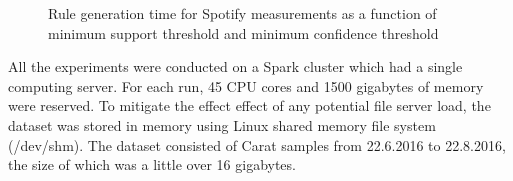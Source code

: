 \begin{figure}[htp]



\caption{Rule generation time for Spotify measurements as a function of minimum support threshold and minimum confidence threshold}
\label{figure:runtimes-spotify}
\end{figure}

All the experiments were conducted on a Spark cluster which had a single computing server. For each run, 45 CPU cores and 1500 gigabytes of memory were reserved. To mitigate the effect effect of any potential file server load, the dataset was stored in memory using Linux shared memory file system (/dev/shm). The dataset consisted of Carat samples from 22.6.2016 to 22.8.2016, the size of which was a little over 16 gigabytes.


